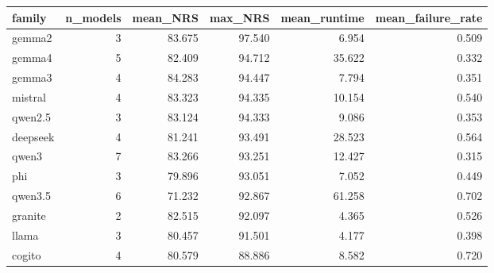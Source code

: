 \begin{tabular}{lrrrrr}
\toprule
family & n\_models & mean\_NRS & max\_NRS & mean\_runtime & mean\_failure\_rate \\
\midrule
gemma2 & 3 & 83.675 & 97.540 & 6.954 & 0.509 \\
gemma4 & 5 & 82.409 & 94.712 & 35.622 & 0.332 \\
gemma3 & 4 & 84.283 & 94.447 & 7.794 & 0.351 \\
mistral & 4 & 83.323 & 94.335 & 10.154 & 0.540 \\
qwen2.5 & 3 & 83.124 & 94.333 & 9.086 & 0.353 \\
deepseek & 4 & 81.241 & 93.491 & 28.523 & 0.564 \\
qwen3 & 7 & 83.266 & 93.251 & 12.427 & 0.315 \\
phi & 3 & 79.896 & 93.051 & 7.052 & 0.449 \\
qwen3.5 & 6 & 71.232 & 92.867 & 61.258 & 0.702 \\
granite & 2 & 82.515 & 92.097 & 4.365 & 0.526 \\
llama & 3 & 80.457 & 91.501 & 4.177 & 0.398 \\
cogito & 4 & 80.579 & 88.886 & 8.582 & 0.720 \\
\bottomrule
\end{tabular}
